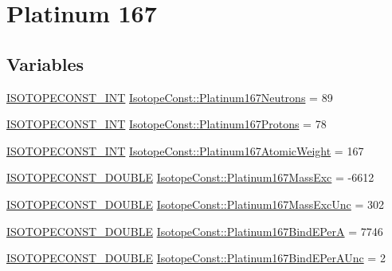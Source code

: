 \hypertarget{group___isotope_const-_platinum-_pt167}{}\section{Platinum 167}
\label{group___isotope_const-_platinum-_pt167}
\subsection*{Variables}
\begin{DoxyCompactItemize}
\item 
\mbox{\hyperlink{group___isotope_const-_macros_ga5f18360b3e99483a35c32d789e62621c}{I\+S\+O\+T\+O\+P\+E\+C\+O\+N\+S\+T\+\_\+\+I\+NT}} \mbox{\hyperlink{group___isotope_const-_platinum-_pt167_gaf57a3cdc9f27ce48eb2ef58334415c72}{Isotope\+Const\+::\+Platinum167\+Neutrons}} = 89
\item 
\mbox{\hyperlink{group___isotope_const-_macros_ga5f18360b3e99483a35c32d789e62621c}{I\+S\+O\+T\+O\+P\+E\+C\+O\+N\+S\+T\+\_\+\+I\+NT}} \mbox{\hyperlink{group___isotope_const-_platinum-_pt167_gaa7ec7103993faff9350166cf46934172}{Isotope\+Const\+::\+Platinum167\+Protons}} = 78
\item 
\mbox{\hyperlink{group___isotope_const-_macros_ga5f18360b3e99483a35c32d789e62621c}{I\+S\+O\+T\+O\+P\+E\+C\+O\+N\+S\+T\+\_\+\+I\+NT}} \mbox{\hyperlink{group___isotope_const-_platinum-_pt167_gaa36b0203987f8f80010d64bc90168545}{Isotope\+Const\+::\+Platinum167\+Atomic\+Weight}} = 167
\item 
\mbox{\hyperlink{group___isotope_const-_macros_ga8f45a7272ce02c0b4c65c44636ed719a}{I\+S\+O\+T\+O\+P\+E\+C\+O\+N\+S\+T\+\_\+\+D\+O\+U\+B\+LE}} \mbox{\hyperlink{group___isotope_const-_platinum-_pt167_gada279351276755788a92c9d640aa7464}{Isotope\+Const\+::\+Platinum167\+Mass\+Exc}} = -\/6612
\item 
\mbox{\hyperlink{group___isotope_const-_macros_ga8f45a7272ce02c0b4c65c44636ed719a}{I\+S\+O\+T\+O\+P\+E\+C\+O\+N\+S\+T\+\_\+\+D\+O\+U\+B\+LE}} \mbox{\hyperlink{group___isotope_const-_platinum-_pt167_ga41be748115a702bcee3ce830fa3cc1a7}{Isotope\+Const\+::\+Platinum167\+Mass\+Exc\+Unc}} = 302
\item 
\mbox{\hyperlink{group___isotope_const-_macros_ga8f45a7272ce02c0b4c65c44636ed719a}{I\+S\+O\+T\+O\+P\+E\+C\+O\+N\+S\+T\+\_\+\+D\+O\+U\+B\+LE}} \mbox{\hyperlink{group___isotope_const-_platinum-_pt167_ga9e5e290c69cb5cb7831a600be8bffd0e}{Isotope\+Const\+::\+Platinum167\+Bind\+E\+PerA}} = 7746
\item 
\mbox{\hyperlink{group___isotope_const-_macros_ga8f45a7272ce02c0b4c65c44636ed719a}{I\+S\+O\+T\+O\+P\+E\+C\+O\+N\+S\+T\+\_\+\+D\+O\+U\+B\+LE}} \mbox{\hyperlink{group___isotope_const-_platinum-_pt167_ga5e6648f327a847488be7d1fa79ae118d}{Isotope\+Const\+::\+Platinum167\+Bind\+E\+Per\+A\+Unc}} = 2

\end{DoxyCompactItemize}
